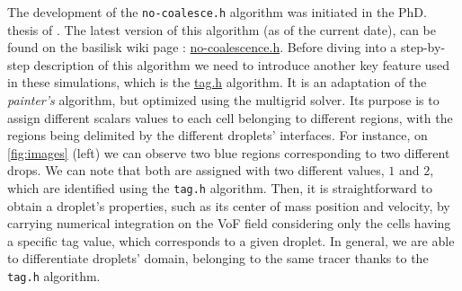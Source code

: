 The development of the \texttt{no-coalesce.h} algorithm was initiated in the PhD. thesis of \citet{mani2021numerical}.
The latest version of this algorithm (as of the current date), can be found on the basilisk wiki page : \href{http://basilisk.fr/sandbox/fintzin/Rising-Suspenion/no-coalescence.h}{no-coalescence.h}.
Before  diving into a step-by-step description of this algorithm we need to introduce another key feature used in these simulations, which is the \href{http://basilisk.fr/src/tag.h}{tag.h} algorithm. 
It is an adaptation of the \textit{painter’s} algorithm, but optimized using the multigrid solver. 
Its purpose is to assign different scalars values to each cell belonging to different regions, with the regions being delimited by the different droplets' interfaces. 
For instance, on \ref{fig:images} (left) we can observe two blue regions corresponding to two different drops.
We can note that both are assigned with two different values, $1$ and $2$, which are identified using the \texttt{tag.h} algorithm. 
Then, it is straightforward to obtain a droplet's properties, such as its center of mass position and velocity, by carrying numerical integration on the VoF field considering only the cells having a specific tag value, which corresponds to a given droplet.  
In general, we are able to differentiate droplets' domain, belonging to the same tracer thanks to the \texttt{tag.h} algorithm. 


